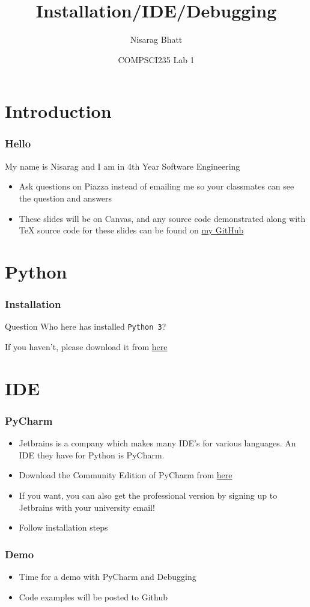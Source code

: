 \documentclass{beamer}
\title[COMPSCI 235 Lab 1 (2020)]
{Installation/IDE/Debugging}
\author{Nisarag Bhatt}
\date[July 2020] 
{COMPSCI235 Lab 1}
\begin{document}
\frame{\titlepage}
\section{Introduction}
\begin{frame}
  \frametitle{Hello}
  My name is Nisarag and I am in 4th Year Software Engineering 
  \begin{itemize}
    \item Ask questions on Piazza instead of emailing me so your classmates can see the question and answers 
    \item These slides will be on Canvas, and any source code demonstrated along with TeX source code for these slides can be found on \href{https://github.com/FocalChord}{my GitHub}
  \end{itemize}
\end{frame}
\section{Python}
\begin{frame}
  \frametitle{Installation}
  \begin{block}{Question}
  	Who here has installed \texttt{Python 3}?    
  \end{block}
  \pause
  If you haven't, please download it from \href{https://www.python.org/downloads/}{here} 
\end{frame}
\section{IDE}
\begin{frame}
  \frametitle{PyCharm}
  \begin{itemize}
  	\item Jetbrains is a company which makes many IDE's for various languages. An IDE they have for Python is PyCharm.
    \item Download the Community Edition of PyCharm from \href{https://www.jetbrains.com/pycharm/}{here}
    \item If you want, you can also get the professional version by signing up to Jetbrains with your university email!
    \item Follow installation steps
   \end{itemize}
\end{frame}
\begin{frame}
  \frametitle{Demo}
  \begin{itemize}
  	\item Time for a demo with PyCharm and Debugging
  	\item Code examples will be posted to Github
  \end{itemize}
   \end{frame}
\end{document}
